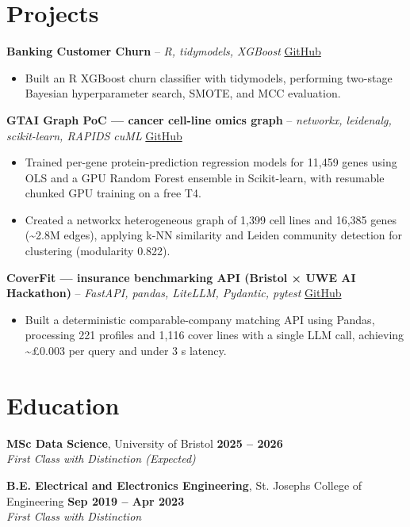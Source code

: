 \documentclass[a4paper,11pt]{article}
\begin{document}
\section{Projects}
\noindent\textbf{Banking Customer Churn} -- \textit{R, tidymodels, XGBoost} \hfill \href{https://github.com/Thiruvel-AP/Banking-Customer-Churn-Prediction}{GitHub}
\begin{itemize}
  \item Built an R XGBoost churn classifier with tidymodels, performing two-stage Bayesian hyperparameter search, SMOTE, and MCC evaluation.
\end{itemize}
\vspace{3pt}
\noindent\textbf{GTAI Graph PoC — cancer cell-line omics graph} -- \textit{networkx, leidenalg, scikit-learn, RAPIDS cuML} \hfill \href{https://github.com/Thiruvel-AP/GTAI-GraphPOC}{GitHub}
\begin{itemize}
  \item Trained per-gene protein-prediction regression models for 11,459 genes using OLS and a GPU Random Forest ensemble in Scikit-learn, with resumable chunked GPU training on a free T4.
  \item Created a networkx heterogeneous graph of 1,399 cell lines and 16,385 genes (\textasciitilde{}2.8M edges), applying k-NN similarity and Leiden community detection for clustering (modularity 0.822).
\end{itemize}
\vspace{3pt}
\noindent\textbf{CoverFit — insurance benchmarking API (Bristol × UWE AI Hackathon)} -- \textit{FastAPI, pandas, LiteLLM, Pydantic, pytest} \hfill \href{https://github.com/Thiruvel-AP/AIHackathon-Phoenix}{GitHub}
\begin{itemize}
  \item Built a deterministic comparable-company matching API using Pandas, processing 221 profiles and 1,116 cover lines with a single LLM call, achieving \textasciitilde{}£0.003 per query and under 3 s latency.
\end{itemize}

\section{Education}
\textbf{MSc Data Science}, University of Bristol \hfill \textbf{2025 – 2026}\\ \textit{First Class with Distinction (Expected)}\par
\vspace{3pt}
\textbf{B.E. Electrical and Electronics Engineering}, St. Joseph\textquotesingle{}s College of Engineering \hfill \textbf{Sep 2019 – Apr 2023}\\ \textit{First Class with Distinction}\par
\end{document}
